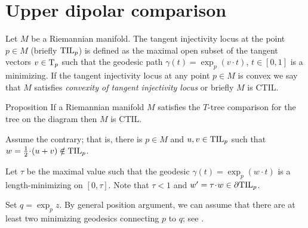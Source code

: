 \section{Upper dipolar comparison}

Let $M$ be a Riemannian manifold.
The tangent injectivity locus at the point $p\in M$ (briefly $\mathrm{\rm TIL}_p$) is defined as the maximal open subset of the tangent vectors $v\in\mathrm{T}_p$ such that the geodesic path $\gamma(t)=\exp_p(v\cdot t)$, $t\in [0,1]$ is a minimizing.
If the tangent injectivity locus at any point $p\in M$ is convex we say that $M$ satisfies \emph{convexity of  tangent injectivity locus} or briefly $M$ is CTIL.

{

\begin{wrapfigure}[5]{r}{24 mm}
\end{wrapfigure}

\begin{thm}{Proposition}\label{T=>CTIL}
If a Riemannian manifold $M$ satisfies the $T$-tree comparison for the tree on the diagram then $M$ is CTIL.
\end{thm}

Assume the contrary; that is, there is $p\in M$ and $u,v\zz\in \TIL_p$ such that $w=\tfrac12\cdot(u+v)\notin \TIL_p$.

Let $\tau$ be the maximal value such that the geodesic $\gamma(t)=\exp_p(w\cdot t)$ is a length-minimizing on $[0,\tau]$.
Note that $\tau<1$ and $w'=\tau\cdot w\in\partial \TIL_p$.

}

Set $q=\exp_p z$.
By general position argument, we can assume that there are at least two minimizing geodesics connecting $p$ to $q$; see \cite{karcher}.

